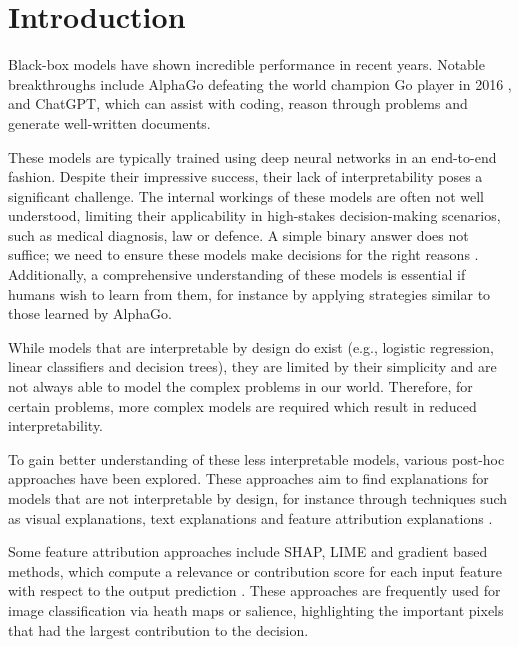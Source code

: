 \chapter{Introduction}

\setcounter{page}{1} %



Black-box models have shown incredible performance in recent years. Notable breakthroughs include AlphaGo defeating the world champion Go player in 2016 \citep{fuAlphaGoMonteCarlo2016}, and ChatGPT, which can assist with coding, reason through problems and generate well-written documents.

These models are typically trained using deep neural networks in an end-to-end fashion. Despite their impressive success, their lack of interpretability poses a significant challenge. The internal workings of these models are often not well understood, limiting their applicability in high-stakes decision-making scenarios, such as medical diagnosis, law or defence. A simple binary answer does not suffice; we need to ensure these models make decisions for the right reasons \citep{alammarExplainableAIGuide2021}. Additionally, a comprehensive understanding of these models is essential if humans wish to learn from them, for instance by applying strategies similar to those learned by AlphaGo.

While models that are interpretable by design do exist (e.g., logistic regression, linear classifiers and decision trees), they are limited by their simplicity and are not always able to model the complex problems in our world. Therefore, for certain problems, more complex models are required which result in reduced interpretability.

To gain better understanding of these less interpretable models, various post-hoc approaches have been explored. These approaches aim to find explanations for models that are not interpretable by design, for instance through techniques such as visual explanations, text explanations and feature attribution explanations \citep{barredoarrietaExplainableArtificialIntelligence2020a}.

Some feature attribution approaches include SHAP, LIME and gradient based methods, which compute a relevance or contribution score for each input feature with respect to the output prediction \citep{lundbergUnifiedApproachInterpreting2017, molnarInterpretableMachineLearning2022, simonyanDeepConvolutionalNetworks2014}. These approaches are frequently used for image classification via heath maps or salience, highlighting the important pixels that had the largest contribution to the decision.


